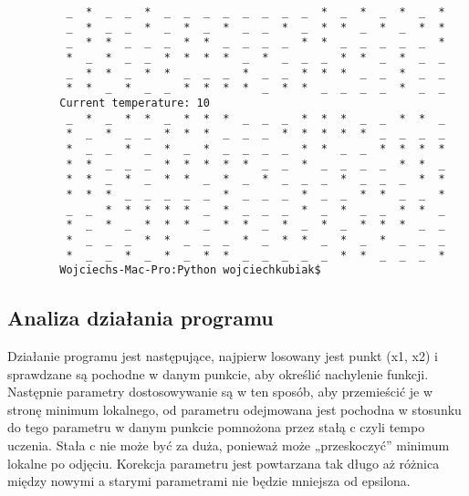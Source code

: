 \documentclass[11pt]{article}
\begin{document}
\begin{lstlisting}
         _  *  _  _  *  _  _  _  _  _  _  _  _  *  _  *  _  *  _  *  
         _  *  _  _  *  _  *  _  *  _  _  *  _  *  *  _  *  _  *  *  
         _  *  *  _  _  _  *  *  _  _  _  _  *  *  _  _  _  _  _  *  
         *  _  *  _  _  *  *  *  *  _  *  _  _  _  *  *  _  *  _  _  
         _  *  *  _  *  *  _  _  _  *  _  _  *  *  *  _  _  *  _  _  
         *  *  _  *  _  _  *  *  *  *  _  *  *  _  _  _  _  *  _  _  
        Current temperature: 10
         _  *  _  *  *  _  *  *  *  _  _  _  *  *  *  _  _  *  *  _  
         *  _  *  _  _  *  *  *  _  _  _  *  *  *  *  *  _  _  _  _  
         *  _  _  *  _  *  _  *  _  _  _  _  *  *  _  _  *  *  *  *  
         *  *  _  _  _  *  *  *  *  *  _  _  *  _  _  _  _  *  *  _  
         *  *  _  *  _  *  *  _  *  _  *  _  _  _  *  _  _  _  *  *  
         *  *  *  _  _  _  _  _  *  _  _  _  *  _  _  *  *  _  _  *  
         _  _  *  *  *  *  *  _  *  _  _  _  *  _  *  _  _  *  *  _  
         *  _  *  _  *  *  *  _  *  *  _  *  _  *  _  *  *  *  _  _  
         *  _  _  _  *  *  _  _  _  *  _  *  *  _  *  _  *  _  _  _  
         *  _  _  *  _  *  _  *  *  _  _  _  _  _  *  *  _  _  _  *  
        Wojciechs-Mac-Pro:Python wojciechkubiak$ 
    \end{lstlisting}
\subsection{Analiza działania programu}
Działanie programu jest następujące, najpierw losowany jest punkt (x1, x2) i sprawdzane są pochodne w danym punkcie, aby określić nachylenie funkcji. Następnie parametry dostosowywanie są w ten sposób, aby przemieścić je w stronę minimum lokalnego, od parametru odejmowana jest pochodna w stosunku do tego parametru w danym punkcie pomnożona przez stałą c czyli tempo uczenia. Stała c nie może być za duża, ponieważ może „przeskoczyć” minimum lokalne po odjęciu.
Korekcja parametru jest powtarzana tak długo aż różnica między nowymi a starymi parametrami nie będzie mniejsza od epsilona.
\end{document}
